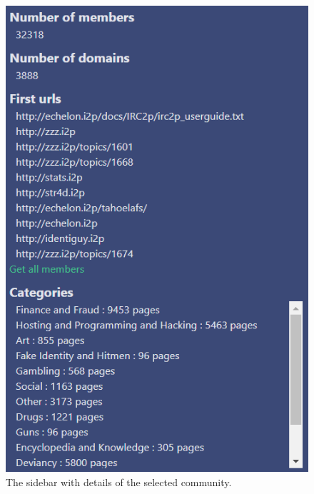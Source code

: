 \begin{figure}
  \begin{minipage}[t]{0.475\textwidth}
    \centering
    \includegraphics[width=\textwidth]{Images/community_sidebar.png}
    \caption{The sidebar with details of the selected community.}
   \label{sidebarCommunityDetails}
  \end{minipage} \hfill
  \begin{minipage}[t]{0.475\textwidth}
    \centering

\end{minipage}
\end{figure}
